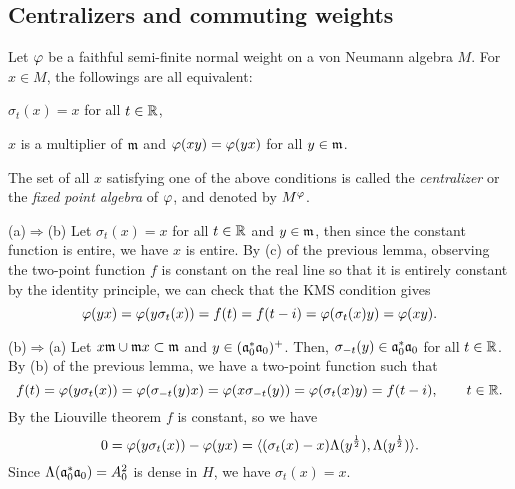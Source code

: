 \documentclass{../../../small}
\begin{document}
\subsection{Centralizers and commuting weights}

\begin{prop}[Centralizers]
Let $\varphi$ be a faithful semi-finite normal weight on a von Neumann algebra $M$.
For $x\in M$, the followings are all equivalent:
\begin{parts}
\item $\sigma_t(x)=x$ for all $t\in\mathbb{R}$,
\item $x$ is a multiplier of $\mathfrak{m}$ and $\varphi(xy)=\varphi(yx)$ for all $y\in\mathfrak{m}$.
\end{parts}
The set of all $x$ satisfying one of the above conditions is called the \emph{centralizer} or the \emph{fixed point algebra} of $\varphi$, and denoted by $M^\varphi$.
\end{prop}
\begin{pf}
(a)$\Rightarrow$(b)
Let $\sigma_t(x)=x$ for all $t\in\mathbb{R}$ and $y\in\mathfrak{m}$, then since the constant function is entire, we have $x$ is entire.
By (c) of the previous lemma, observing the two-point function $f$ is constant on the real line so that it is entirely constant by the identity principle, we can check that the KMS condition gives
\[\varphi(yx)=\varphi(y\sigma_t(x))=f(t)=f(t-i)=\varphi(\sigma_t(x)y)=\varphi(xy).\]

(b)$\Rightarrow$(a)
Let $x\mathfrak{m}\cup\mathfrak{m} x\subset\mathfrak{m}$ and $y\in(\mathfrak{a}_0^*\mathfrak{a}_0)^+$.
Then, $\sigma_{-t}(y)\in\mathfrak{a}_0^*\mathfrak{a}_0$ for all $t\in\mathbb{R}$.
By (b) of the previous lemma, we have a two-point function such that
\[f(t)=\varphi(y\sigma_t(x))=\varphi(\sigma_{-t}(y)x)=\varphi(x\sigma_{-t}(y))=\varphi(\sigma_t(x)y)=f(t-i),\qquad t\in\mathbb{R}.\]
By the Liouville theorem $f$ is constant, so we have
\[0=\varphi(y\sigma_t(x))-\varphi(yx)=\langle(\sigma_t(x)-x)\Lambda(y^{\frac12}),\Lambda(y^{\frac12})\rangle.\]
Since $\Lambda(\mathfrak{a}_0^*\mathfrak{a}_0)=A_0^2$ is dense in $H$, we have $\sigma_t(x)=x$.
\end{pf}
\end{document}
